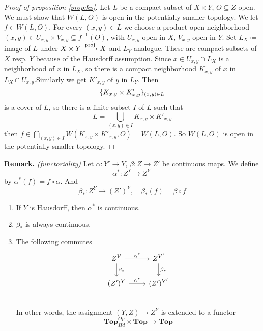 \documentclass[language=english]{TemplateLecture}
\begin{document}
\begin{proof}[Proof of proposition \ref{prop:kp}]
    Let \(L\) be a compact subset of \(X \times Y\), \(O \subseteq Z\) open. We must show that \(W(L,O)\) is open in the potentially smaller topology. We let \(f \in W(L,O)\). For every \((x,y) \in L\) we choose a product open neighborhood \((x,y) \in U_{x,y} \times V_{x,y} \subseteq f^{-1}(O)\), with \(U_{x,y}\) open in \(X\), \(V_{x,y}\) open in \(Y\). Set \(L_{X} \coloneq \) image of \(L\) under \(X\times Y \xrightarrow{\operatorname{proj}} X\) and \(L_Y\) analogue. These are compact subsets of \(X\) resp. \(Y\) because of the Hausdorff assumption. Since \(x \in U_{x,y} \cap L_X\) is a neighborhood of \(x\) in \(L_X\), so there is a compact neighborhood \(K_{x,y}\) of \(x\) in \(L_X\cap U_{x,y}\).Similarly we get \(K'_{x,y}\) of \(y\) in \(L_Y\). Then
    \[\{K_{x,y} \times K'_{x,y}\}_{(x,y) \in L}\]
    is a cover of \(L\), so there is a finite subset \(I\) of \(L\) such that
    \[L = \bigcup_{(x,y) \in I}K_{x,y} \times K'_{x,y}\]
    then \(f \in \bigcap_{(x,y) \in I} W(K_{x,y} \times K'_{x,y}, O) = W(L,O)\). So \(W(L,O)\) is open in the potentially smaller topology.
\end{proof}

\textbf{Remark.} \emph{(functoriality)} Let \(\alpha\colon Y' \to Y\), \(\beta\colon Z \to Z'\) be continuous maps. We define
\[\alpha^*\colon Z^Y \to Z^{Y'}\]
by \(\alpha^*(f) = f \circ \alpha\). And
\[\beta_* \colon Z^Y \to (Z')^Y, \quad \beta_*(f) = \beta\circ f\]

\begin{proposition}
    \begin{enumerate}
        \item If \(Y\) is Hausdorff, then \(\alpha^*\) is continuous.
        \item \(\beta_*\) is always continuous.
        \item The following commutes
        \[\begin{tikzcd}
            Z^Y \ar[r, "\alpha^*"] \ar[d, "\beta_*"] & Z^{Y'} \ar[d, "\beta_*"] \\
            (Z')^Y \ar[r, "\alpha^*"] & (Z')^{Y'} \\
        \end{tikzcd}\]
        In other words, the assignment \((Y,Z) \mapsto Z^Y\) is extended to a functor
        \[\mathbf{Top}_{Hd}^{Op} \times \mathbf{Top} \to \mathbf{Top}\]
    \end{enumerate}
\end{proposition}
\end{document}

